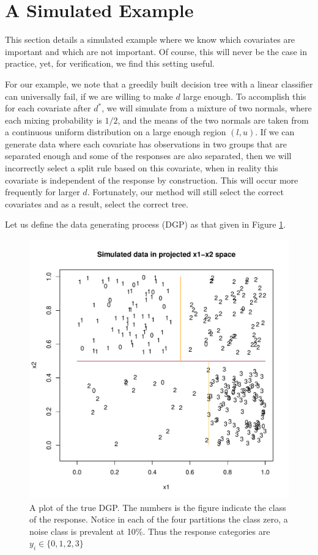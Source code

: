 \section{A Simulated Example}\label{sec:ase}

This section details a simulated example where we know which covariates are important and which are not important. Of course, this will never be the case in practice, yet, for verification, we find this setting useful. 

For our example, we note that a greedily built decision tree with a linear classifier can universally fail, if we are willing to make $d$ large enough. To accomplish this for each covariate after $d^*$, we will simulate from a mixture of two normals, where each mixing probability is $1/2$, and the means of the two normals are taken from a continuous uniform distribution on a large enough region $(l,u)$. If we can generate data where each covariate has observations in two groups that are separated enough and some of the responses are also separated, then we will incorrectly select a split rule based on this covariate, when in reality this covariate is independent of the response by construction. This will occur more frequently for larger $d$. Fortunately, our method will still select the correct covariates and as a result, select the correct tree.   

 Let us define the data generating process (DGP) as that given in Figure \ref{fig:awesome_image2}.  

\begin{figure}[h]
\centering
\label{fig:3fig_tree}
  \includegraphics[scale=0.4]{figures/proj_plot.pdf}
  \caption{A plot of the true DGP. The numbers is the figure indicate the class of the response. Notice in each of the four partitions  the class zero, a noise class is prevalent at 10\%. Thus the response categories are $y_i \in \{0,1,2,3\}$ }\label{fig:awesome_image2}
\end{figure}

